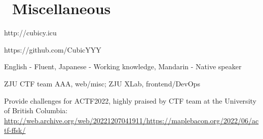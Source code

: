 \documentclass{resume}
\begin{document}
\section{\faInfo\ Miscellaneous}
\begin{description}[parsep=0.5ex]
  \item[Blog] http://cubicy.icu
  \item[GitHub] https://github.com/CubicYYY
  \item[Languages] English - Fluent, Japanese - Working knowledge, Mandarin - Native speaker
  \item[Team] ZJU CTF team AAA, web/misc; ZJU XLab, frontend/DevOps
  \item[Other] Provide challenges for ACTF2022, highly praised by CTF team at the University of British Columbia: \href{http://web.archive.org/web/20221207041911/https://maplebacon.org/2022/06/actf-ffsk/}{http://web.archive.org/web/20221207041911/https://maplebacon.org/2022/06/actf-ffsk/}
\end{description}

%
%
\end{document}
